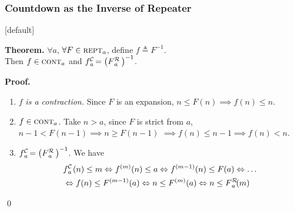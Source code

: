 \begin{frame}
\frametitle{Countdown as the Inverse of Repeater}
\setlength{\leftmargini}{3.8em}
[default]

\textbf{Theorem.} $\forall a$, $\forall F\in \text{\scshape{rept}}_a$, define $f\triangleq F^{-1}$. 
\\ Then $f\in \text{\scshape{cont}}_a$ and $\cdt{f}{a}~ = \left(\rf{F}{a}\ \right)^{-1}$.

\bigskip

\textbf{Proof.}

\begin{enumerate}
	\item $f$ \textit{is a contraction.} Since $F$ is an expansion, $n \le F(n)\implies f(n)\le n$.
	
	\item $f\in \text{\scshape{cont}}_a$. Take $n> a$, since $F$ is strict from $a$, $n-1 < F(n-1) \implies n\ge F(n-1)$ $\implies f(n)\le n - 1 \implies f(n) < n$.
	
	\item $\cdt{f}{a}~ = \left(\rf{F}{a}\ \right)^{-1}$. We have
	\begin{equation*} \label{eq: rf-upp-inv}
	\begin{aligned}
	& \cdt{f}{a}(n)\le m \iff f^{(m)}(n)\le a \iff f^{(m-1)}(n)\le F(a) \iff \ldots \\
	&  \iff f(n)\le F^{(m-1)}(a) \iff n\le F^{(m)}(a) \iff n\le \rf{F}{a}(m)
	\end{aligned}
	\vspace{-0.5em}
	\end{equation*}
\end{enumerate}
\qed

\end{frame}


